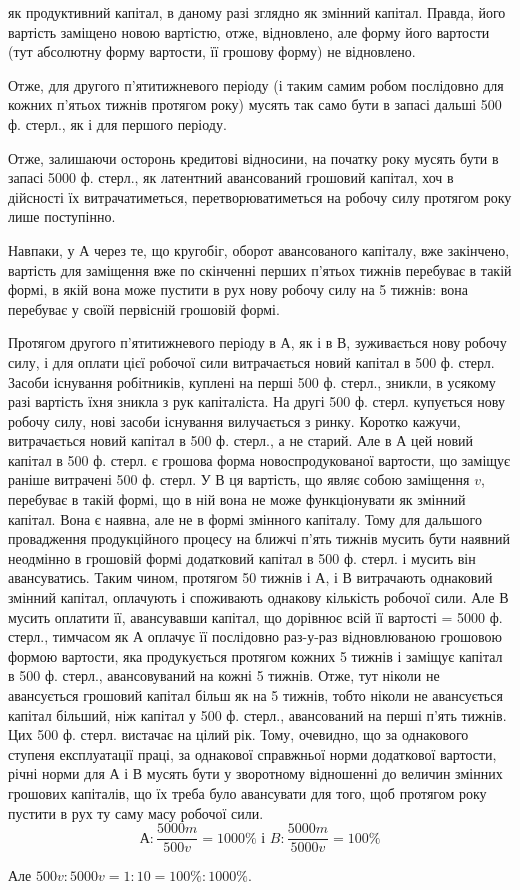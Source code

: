 \parcont{}  %
як продуктивний капітал, в даному разі зглядно як змінний капітал.
Правда, його вартість заміщено новою вартістю, отже, відновлено, але
форму його вартости (тут абсолютну форму вартости, її грошову форму)
не відновлено.

Отже, для другого п’ятитижневого періоду (і таким самим робом
послідовно для кожних п’ятьох тижнів протягом року) мусять так
само бути в запасі дальші 500 ф. стерл., як і для першого періоду.

Отже, залишаючи осторонь кредитові відносини, на початку року мусять
бути в запасі 5000 ф. стерл., як латентний авансований грошовий капітал,
хоч в дійсності їх витрачатиметься, перетворюватиметься на робочу
силу протягом року лише поступінно.

Навпаки, у $А$ через те, що кругобіг, оборот авансованого капіталу,
вже закінчено, вартість для заміщення вже по скінченні перших п’ятьох
тижнів перебуває в такій формі, в якій вона може пустити в рух нову
робочу силу на 5 тижнів: вона перебуває у своїй первісній грошовій формі.

Протягом другого п’ятитижневого періоду в $А$, як і в $В$, зуживається
нову робочу силу, і для оплати цієї робочої сили витрачається новий капітал
в 500 ф. стерл. Засоби існування робітників, куплені на перші 500 ф.
стерл., зникли, в усякому разі вартість їхня зникла з рук капіталіста.
На другі 500 ф. стерл. купується нову робочу силу, нові засоби існування
вилучається з ринку. Коротко кажучи, витрачається новий капітал в 500 ф.
стерл., а не старий. Але в $А$ цей новий капітал в 500 ф. стерл. є грошова
форма новоспродукованої вартости, що заміщує раніше витрачені 500 ф.
стерл. У $В$ ця вартість, що являє собою заміщення $v$, перебуває в такій
формі, що в ній вона не може функціонувати як змінний капітал. Вона є
наявна, але не в формі змінного капіталу. Тому для дальшого провадження
продукційного процесу на ближчі п’ять тижнів мусить бути наявний неодмінно
в грошовій формі додатковий капітал в 500 ф. стерл. і мусить він авансуватись.
Таким чином, протягом 50 тижнів і $А$, і $В$ витрачають однаковий
змінний капітал, оплачують і споживають однакову кількість робочої сили.
Але $В$ мусить оплатити її, авансувавши капітал, що дорівнює всій її
вартості = 5000 ф. стерл., тимчасом як $А$ оплачує її послідовно раз-у-раз
відновлюваною грошовою формою вартости, яка продукується протягом
кожних 5 тижнів і заміщує капітал в 500 ф. стерл., авансовуваний на кожні
5 тижнів. Отже, тут ніколи не авансується грошовий капітал більш як
на 5 тижнів, тобто ніколи не авансується капітал більший, ніж капітал
у 500 ф. стерл., авансований на перші п’ять тижнів. Цих 500 ф. стерл. вистачає
на цілий рік. Тому, очевидно, що за однакового ступеня експлуатації
праці, за однакової справжньої норми додаткової вартости, річні
норми для $А$ і В мусять бути у зворотному відношенні до величин змінних
грошових капіталів, що їх треба було авансувати для того, щоб
протягом року пустити в рух ту саму масу робочої сили.
\[
А: \frac{5000 m}{500 v} = 1000\% \text{ і } B: \frac{5000 m}{5000 v} = 100\%
\]

Але $500 v: 5000 v = 1: 10 = 100\%: 1000\%$.
